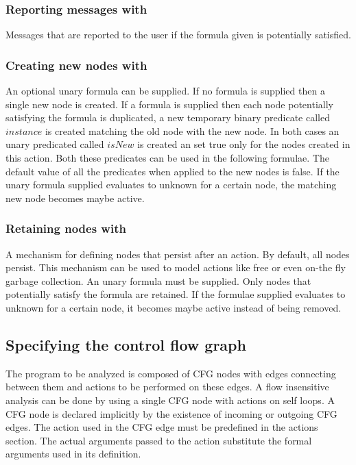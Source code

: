\subsubsection{Reporting messages with \tvmessage}
Messages that are reported to the user if the formula given is
potentially satisfied.

\subsubsection{Creating new nodes with \new}

An optional unary formula can be supplied. If no formula is
supplied then a single new node is created. If a formula is
supplied then each node potentially satisfying the formula is
duplicated, a new temporary binary predicate called $instance$ is
created matching the old node with the new node. In both cases an
unary predicated called $isNew$ is created an set true only for
the nodes created in this action. Both these predicates can be
used in the following formulae. The default value of all the
predicates when applied to the new nodes is false. If the unary
formula supplied evaluates to unknown for a certain node, the
matching new node becomes maybe active.

\subsubsection{Retaining nodes with \retain}

A mechanism for defining nodes that persist after an action. By
default, all nodes persist. This mechanism can be used to model
actions like free or even on-the fly garbage collection. An unary
formula must be supplied. Only nodes that potentially satisfy the
formula are retained. If the formulae supplied evaluates to
unknown for a certain node, it becomes maybe active instead of
being removed.

\subsection{\label{Se:CFGMan}Specifying the control flow graph}

The program to be analyzed is composed of CFG nodes with edges
connecting between them and actions to be performed on these
edges.  A flow insensitive analysis can be done by using a single
CFG node with actions on self loops.  A CFG node is declared
implicitly by the existence of incoming or outgoing CFG edges.
The action used in the CFG edge must be predefined in the actions
section.  The actual arguments passed to the action substitute the
formal arguments used in its definition.

